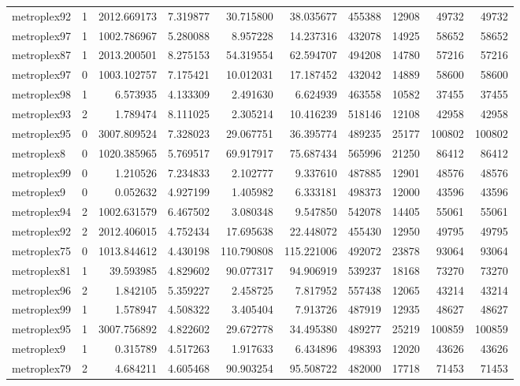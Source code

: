 \begin{longtable}{|l|r|r|r|r|r|r|r|r|r|}
metroplex92 & 1 & 2012.669173 & 7.319877 & 30.715800 & 38.035677 & 455388 & 12908 & 49732 & 49732 \\
metroplex97 & 1 & 1002.786967 & 5.280088 & 8.957228 & 14.237316 & 432078 & 14925 & 58652 & 58652 \\
metroplex87 & 1 & 2013.200501 & 8.275153 & 54.319554 & 62.594707 & 494208 & 14780 & 57216 & 57216 \\
metroplex97 & 0 & 1003.102757 & 7.175421 & 10.012031 & 17.187452 & 432042 & 14889 & 58600 & 58600 \\
metroplex98 & 1 & 6.573935 & 4.133309 & 2.491630 & 6.624939 & 463558 & 10582 & 37455 & 37455 \\
metroplex93 & 2 & 1.789474 & 8.111025 & 2.305214 & 10.416239 & 518146 & 12108 & 42958 & 42958 \\
metroplex95 & 0 & 3007.809524 & 7.328023 & 29.067751 & 36.395774 & 489235 & 25177 & 100802 & 100802 \\
metroplex8 & 0 & 1020.385965 & 5.769517 & 69.917917 & 75.687434 & 565996 & 21250 & 86412 & 86412 \\
metroplex99 & 0 & 1.210526 & 7.234833 & 2.102777 & 9.337610 & 487885 & 12901 & 48576 & 48576 \\
metroplex9 & 0 & 0.052632 & 4.927199 & 1.405982 & 6.333181 & 498373 & 12000 & 43596 & 43596 \\
metroplex94 & 2 & 1002.631579 & 6.467502 & 3.080348 & 9.547850 & 542078 & 14405 & 55061 & 55061 \\
metroplex92 & 2 & 2012.406015 & 4.752434 & 17.695638 & 22.448072 & 455430 & 12950 & 49795 & 49795 \\
metroplex75 & 0 & 1013.844612 & 4.430198 & 110.790808 & 115.221006 & 492072 & 23878 & 93064 & 93064 \\
metroplex81 & 1 & 39.593985 & 4.829602 & 90.077317 & 94.906919 & 539237 & 18168 & 73270 & 73270 \\
metroplex96 & 2 & 1.842105 & 5.359227 & 2.458725 & 7.817952 & 557438 & 12065 & 43214 & 43214 \\
metroplex99 & 1 & 1.578947 & 4.508322 & 3.405404 & 7.913726 & 487919 & 12935 & 48627 & 48627 \\
metroplex95 & 1 & 3007.756892 & 4.822602 & 29.672778 & 34.495380 & 489277 & 25219 & 100859 & 100859 \\
metroplex9 & 1 & 0.315789 & 4.517263 & 1.917633 & 6.434896 & 498393 & 12020 & 43626 & 43626 \\
metroplex79 & 2 & 4.684211 & 4.605468 & 90.903254 & 95.508722 & 482000 & 17718 & 71453 & 71453 \\

\end{longtable}
